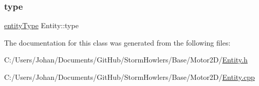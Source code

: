 \mbox{\label{class_entity_a70da6c268b2cc0b615095dcb762a51d0}} 
\subsubsection{\texorpdfstring{type}{type}}
{\footnotesize\ttfamily \mbox{\hyperlink{class_entity_afd4a8ca3ac152f193c21d6a5100f1192}{entity\+Type}} Entity\+::type}



The documentation for this class was generated from the following files\+:\begin{DoxyCompactItemize}
\item 
C\+:/\+Users/\+Johan/\+Documents/\+Git\+Hub/\+Storm\+Howlers/\+Base/\+Motor2\+D/\mbox{\hyperlink{_entity_8h}{Entity.\+h}}\item 
C\+:/\+Users/\+Johan/\+Documents/\+Git\+Hub/\+Storm\+Howlers/\+Base/\+Motor2\+D/\mbox{\hyperlink{_entity_8cpp}{Entity.\+cpp}}\end{DoxyCompactItemize}
